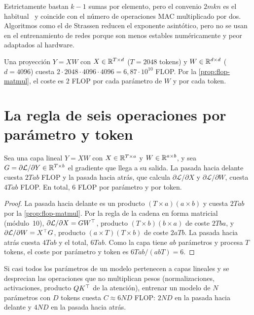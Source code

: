 \begin{observacion}
Estrictamente bastan $k-1$ sumas por elemento, pero el convenio $2mkn$ es el habitual~\cite[§3.5]{cs336a1} y coincide con el número de operaciones MAC multiplicado por dos. Algoritmos como el de Strassen reducen el exponente asintótico, pero no se usan en el entrenamiento de redes porque son menos estables numéricamente y peor adaptados al hardware.
\end{observacion}

\begin{ejemplo}\label{ej:capa-lineal}
Una proyección $Y=XW$ con $X\in\mathbb{R}^{T\times d}$ ($T=2048$ tokens) y $W\in\mathbb{R}^{d\times d}$ ($d=4096$) cuesta $2\cdot 2048\cdot 4096\cdot 4096=6{,}87\cdot 10^{10}$ FLOP. Por la \cref{prop:flop-matmul}, el coste es $2$ FLOP por cada parámetro de $W$ y por cada token.
\end{ejemplo}

\section{La regla de seis operaciones por parámetro y token}

\begin{proposicion}\label{prop:6nd-capa}
Sea una capa lineal $Y=XW$ con $X\in\mathbb{R}^{T\times a}$ y $W\in\mathbb{R}^{a\times b}$, y sea $G=\partial\mathcal{L}/\partial Y\in\mathbb{R}^{T\times b}$ el gradiente que llega a su salida. La pasada hacia delante cuesta $2Tab$ FLOP y la pasada hacia atrás, que calcula $\partial\mathcal{L}/\partial X$ y $\partial\mathcal{L}/\partial W$, cuesta $4Tab$ FLOP. En total, $6$ FLOP por parámetro y por token.
\end{proposicion}

\begin{proof}
La pasada hacia delante es un producto $(T\times a)(a\times b)$ y cuesta $2Tab$ por la \cref{prop:flop-matmul}. Por la regla de la cadena en forma matricial (módulo~10), $\partial\mathcal{L}/\partial X=GW^{\top}$, producto $(T\times b)(b\times a)$ de coste $2Tba$, y $\partial\mathcal{L}/\partial W=X^{\top} G$, producto $(a\times T)(T\times b)$ de coste $2aTb$. La pasada hacia atrás cuesta $4Tab$ y el total, $6Tab$. Como la capa tiene $ab$ parámetros y procesa $T$ tokens, el coste por parámetro y token es $6Tab/(abT)=6$.
\end{proof}

\begin{corolario}\label{cor:6nd}
Si casi todos los parámetros de un modelo pertenecen a capas lineales y se desprecian las operaciones que no multiplican pesos (normalizaciones, activaciones, producto $QK^{\top}$ de la atención), entrenar un modelo de $N$ parámetros con $D$ tokens cuesta $C\approx 6ND$ FLOP: $2ND$ en la pasada hacia delante y $4ND$ en la pasada hacia atrás.
\end{corolario}

